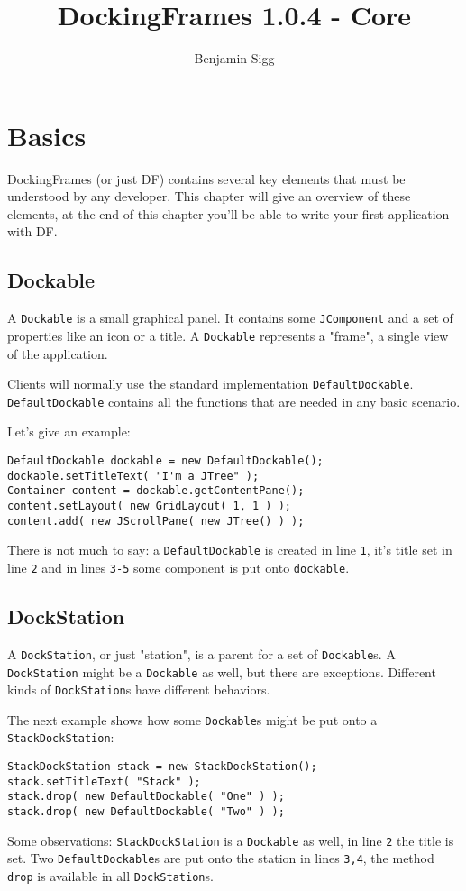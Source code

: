 \documentclass[a4paper,10pt]{article}
\title{DockingFrames 1.0.4 - Core}
\author{Benjamin Sigg}
\newcommand{\src}[1]{\lstinline[basicstyle=\normalsize\ttfamily,keywordstyle=\normalsize\ttfamily,identifierstyle=\normalsize\ttfamily]|#1|}
\begin{document}
\maketitle
\tableofcontents
\newpage


\begin{abstract}
\end{abstract}

\section{Basics}
DockingFrames (or just DF) contains several key elements that must be understood by any developer. This chapter will give an overview of these elements, at the end of this chapter you'll be able to write your first application with DF.

\subsection{Dockable}
A \src{Dockable} is a small graphical panel. It contains some \src{JComponent} and a set of properties like an icon or a title. A \src{Dockable} represents a "frame", a single view of the application.

Clients will normally use the standard implementation \src{DefaultDockable}. \src{DefaultDockable} contains all the functions that are needed in any basic scenario.

Let's give an example:
\begin{lstlisting}
DefaultDockable dockable = new DefaultDockable();
dockable.setTitleText( "I'm a JTree" );
Container content = dockable.getContentPane();
content.setLayout( new GridLayout( 1, 1 ) );
content.add( new JScrollPane( new JTree() ) );
\end{lstlisting}
There is not much to say: a \src{DefaultDockable} is created in line \src{1}, it's title set in line \src{2} and in lines \src{3-5} some component is put onto \src{dockable}.

\subsection{DockStation}
A \src{DockStation}, or just "station", is a parent for a set of \src{Dockable}s. A \src{DockStation} might be a \src{Dockable} as well, but there are exceptions. Different kinds of \src{DockStation}s have different behaviors.

The next example shows how some \src{Dockable}s might be put onto a \\\src{StackDockStation}:
\begin{lstlisting}
StackDockStation stack = new StackDockStation();
stack.setTitleText( "Stack" );
stack.drop( new DefaultDockable( "One" ) );
stack.drop( new DefaultDockable( "Two" ) );
\end{lstlisting}
Some observations: \src{StackDockStation} is a \src{Dockable} as well, in line \src{2} the title is set. Two \src{DefaultDockable}s are put onto the station in lines \src{3,4}, the method \src{drop} is available in all \src{DockStation}s.
\end{document}
